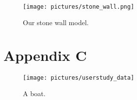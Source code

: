 \begin{figure}[ht]
	\centering
	\texttt{[image: pictures/stone\_wall.png]}
	\caption{Our stone wall model.}
\end{figure}


\clearpage
\pagebreak
\section{Appendix C}

\begin{figure}[ht]
	\texttt{[image: pictures/userstudy\_data]}
	\caption{A boat.}
	\label{fig:boat1}
\end{figure}

